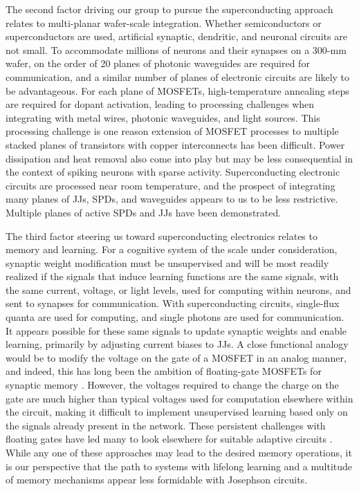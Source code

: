 \documentclass[twocolumn]{article}
\begin{document}
The second factor driving our group to pursue the superconducting approach relates to multi-planar wafer-scale integration. Whether semiconductors or superconductors are used, artificial synaptic, dendritic, and neuronal circuits are not small. To accommodate millions of neurons and their synapses on a 300-mm wafer, on the order of 20 planes of photonic waveguides are required for communication, and a similar number of planes of electronic circuits are likely to be advantageous. For each plane of MOSFETs, high-temperature annealing steps are required for dopant activation, leading to processing challenges when integrating with metal wires, photonic waveguides, and light sources. This processing challenge is one reason extension of MOSFET processes to multiple stacked planes of transistors with copper interconnects has been difficult. Power dissipation and heat removal also come into play but may be less consequential in the context of spiking neurons with sparse activity. Superconducting electronic circuits are processed near room temperature, and the prospect of integrating many planes of JJs, SPDs, and waveguides appears to us to be less restrictive. Multiple planes of active SPDs\cite{vema2012} and JJs \cite{tobo2019} have been demonstrated.

The third factor steering us toward superconducting electronics relates to memory and learning. For a cognitive system of the scale under consideration, synaptic weight modification must be unsupervised and will be most readily realized if the signals that induce learning functions are the same signals, with the same current, voltage, or light levels, used for computing within neurons, and sent to synapses for communication. With superconducting circuits, single-flux quanta are used for computing, and single photons are used for communication. It appears possible for these same signals to update synaptic weights and enable learning, primarily by adjusting current biases to JJs. A close functional analogy would be to modify the voltage on the gate of a MOSFET in an analog manner, and indeed, this has long been the ambition of floating-gate MOSFETs for synaptic memory \cite{hama2013}. However, the voltages required to change the charge on the gate are much higher than typical voltages used for computation elsewhere within the circuit, making it difficult to implement unsupervised learning based only on the signals already present in the network. These persistent challenges with floating gates have led many to look elsewhere for suitable adaptive circuits \cite{upji2019}. While any one of these approaches may lead to the desired memory operations, it is our perspective that the path to systems with lifelong learning and a multitude of memory mechanisms appear less formidable with Josephson circuits.
\end{document}
